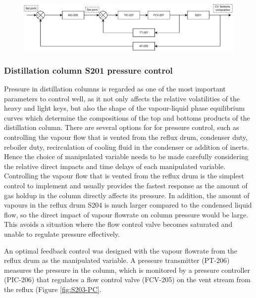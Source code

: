 \begin{figure}[h]
    \centering
    \includegraphics[width=0.8\linewidth]{chapters/4-operation-control/4-Figures/S201-CC.pdf}
    \caption{}
    \label{fig:S201-CC}
\end{figure}



\subsubsection{Distillation column S201 pressure control} %
Pressure in distillation columns is regarded as one of the most important parameters to control well, as it not only affects the relative volatilities of the heavy and light keys, but also the shape of the vapour-liquid phase equilibrium curves which determine the compositions of the top and bottoms products of the distillation column. There are several options for for pressure control, such as controlling the vapour flow that is vented from the reflux drum, condenser duty, reboiler duty, recirculation of cooling fluid in the condenser or addition of inerts. Hence the choice of manipulated variable needs to be made carefully considering the relative direct impacts and time delays of each manipulated variable. Controlling the vapour flow that is vented from the reflux drum is the simplest control to implement and usually provides the fastest response as the amount of gas holdup in the column directly affects its pressure. In addition, the amount of vapours in the reflux drum S204 is much larger compared to the condensed liquid flow, so the direct impact of vapour flowrate on column pressure would be large. This avoids a situation where the flow control valve becomes saturated and unable to regulate pressure effectively. 

An optimal feedback control was designed with the vapour flowrate from the reflux drum as the manipulated variable. A pressure transmitter (PT-206) measures the pressure in the column, which is monitored by a pressure controller (PIC-206) that regulates a flow control valve (FCV-205) on the vent stream from the reflux (Figure \ref{fig:S203-PC}.



